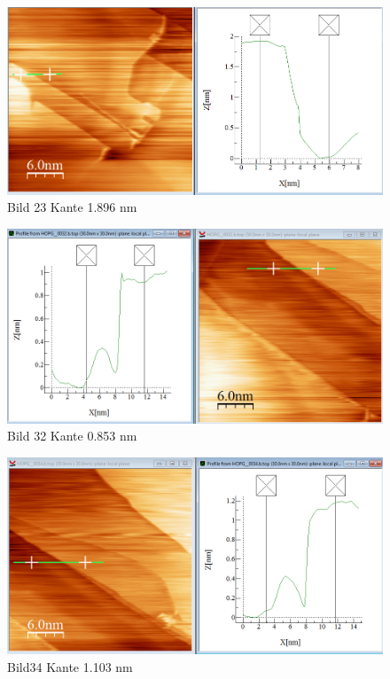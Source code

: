 \documentclass[10pt,a4paper]{article}
\begin{document}
\begin{figure}[]
	\includegraphics[scale = 0.2]{bild23.png}
	\centering
	\caption{Bild 23 Kante 1.896 nm}
	\label{b23}
\end{figure}
\begin{figure}[]
	\includegraphics[scale = 0.2]{bild32.png}
	\centering
	\caption{Bild 32 Kante 0.853 nm}
	\label{b32}
\end{figure}

\begin{figure}[]
	\includegraphics[scale = 0.2]{bild34.png}
	\centering
	\caption{Bild34 Kante 1.103 nm}
	\label{b34}
\end{figure}
\end{document}
